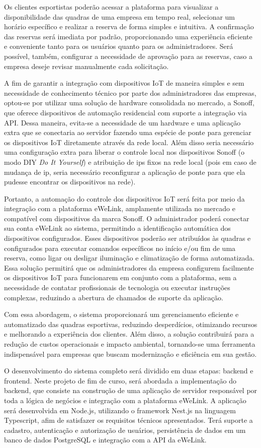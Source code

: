 Os clientes esportistas poderão acessar a plataforma para visualizar a disponibilidade das quadras de uma empresa em tempo real, selecionar um horário específico e realizar a reserva de forma simples e intuitiva. A confirmação das reservas será imediata por padrão, proporcionando uma experiência eficiente e conveniente tanto para os usuários quanto para os administradores. Será possível, também, configurar a necessidade de aprovação para as reservas, caso a empresa deseje revisar manualmente cada solicitação.

A fim de garantir a integração com dispositivos IoT de maneira simples e sem necessidade de conhecimento técnico por parte dos administradores das empresas, optou-se por utilizar uma solução de hardware consolidada no mercado, a Sonoff, que oferece dispositivos de automação residencial com suporte a integração via API. Dessa maneira, evita-se a necessidade de um hardware e uma aplicação extra que se conectaria ao servidor fazendo uma espécie de ponte para gerenciar os dispositivos IoT diretamente através da rede local. Além disso seria necessário uma configuração extra para liberar o controle local nos dispositivos Sonoff (o modo DIY \textit{Do It Yourself}) e atribuição de ips fixos na rede local (pois em caso de mudança de ip, seria necessário reconfigurar a aplicação de ponte para que ela pudesse encontrar os dispositivos na rede).

Portanto, a automação do controle dos dispositivos IoT será feita por meio da integração com a plataforma eWeLink, amplamente utilizada no mercado e compatível com dispositivos da marca Sonoff. O administrador poderá conectar sua conta eWeLink ao sistema, permitindo a identificação automática dos dispositivos configurados. Esses dispositivos poderão ser atribuídos às quadras e configurados para executar comandos específicos no início e/ou fim de uma reserva, como ligar ou desligar iluminação e climatização de forma automatizada. Essa solução permitirá que os administradores da empresa configurem facilmente os dispositivos IoT para funcionarem em conjunto com a plataforma, sem a necessidade de contatar profissionais de tecnologia ou executar instruções complexas, reduzindo a abertura de chamados de suporte da aplicação.

Com essa abordagem, o sistema proporcionará um gerenciamento eficiente e automatizado das quadras esportivas, reduzindo desperdícios, otimizando recursos e melhorando a experiência dos clientes. Além disso, a solução contribuirá para a redução de custos operacionais e impacto ambiental, tornando-se uma ferramenta indispensável para empresas que buscam modernização e eficiência em sua gestão.

O desenvolvimento do sistema completo será dividido em duas etapas: backend e frontend. Neste projeto de fim de curso, será abordada a implementação do backend, que consiste na construção de uma aplicação de servidor responsável por toda a lógica de negócios e integração com a plataforma eWeLink. A aplicação será desenvolvida em Node.js, utilizando o framework Nest.js na linguagem Typescript, afim de satisfazer os requisitos técnicos apresentados. Terá suporte a cadastro, autenticação e autorização de usuários, persistência de dados em um banco de dados PostgreSQL e integração com a API da eWeLink.

